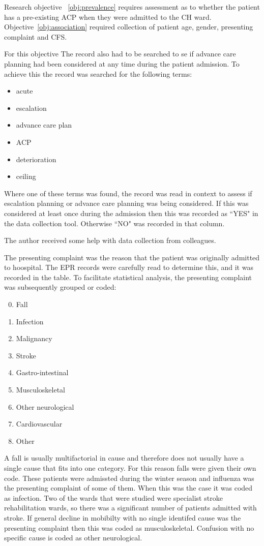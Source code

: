 \documentclass
[
	12pt,
	a4paper,
	oneside,
]{report}
\begin{document}
Research objective~
\ref{obj:prevalence} requires assessment as to whether the patient has a
pre-existing ACP when they were admitted to the CH ward. 
Objective~\ref{obj:association} required collection of patient age, gender,
presenting complaint and CFS. 

For this objective The record also had to be searched to se if advance care
planning had been considered at any time during the patient admission. To 
achieve this the record was searched for the following terms:

\begin{itemize}
\item acute
\item escalation
\item advance care plan
\item ACP
\item deterioration
\item ceiling
\end{itemize}

Where one of these terms was found, the record was read in context to assess if 
escalation planning or advance care planning was being considered. If this
was considered at least once during the admission then this was recorded as 
``YES"
in the data collection tool. Otherwise ``NO" was recorded in that column.

The author received some help with data collection from colleagues.

The presenting complaint was the reason that the patient was originally 
admitted to hoospital. The EPR records were carefully read to determine this,
and it was recorded in the table. To facilitate statistical analysis, the 
presenting complaint was subsequently grouped or coded:
\begin{enumerate}
\setcounter{enumi}{-1}
\item Fall
\item Infection
\item Malignancy
\item Stroke
\item Gastro-intestinal
\item Musculoskeletal
\item Other neurological
\item Cardiovascular
\item Other
\end{enumerate}

A fall is usually multifactorial in cause \parencite{silver:12} and therefore
does not usually have a single cause that fits into one category. For this 
reason falls were given their own code.
These patients were admissted during the winter season and influenza was the
presenting complaint of some of them. When this was the case it was coded as
infection. Two of the wards that were studied were specialist stroke 
rehabilitation wards, so there was a significant number of patients admitted
with stroke. If general decline in mobibilty with no single identifed cause
was the presenting complaint then this was coded as musculoskeletal.
Confusion with no specific cause is coded as other neurological.
\end{document}
